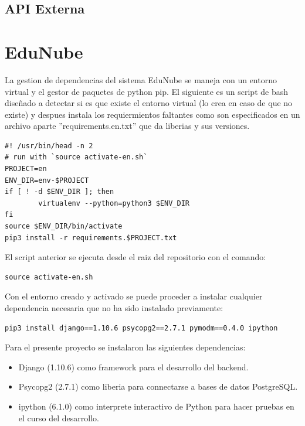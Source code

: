 
%
%

\subsection{API Externa}

\section{EduNube}

La gestion de dependencias del sistema EduNube se maneja con un entorno virtual y el gestor de paquetes de python pip. El siguiente es un script de bash diseñado a detectar si es que existe el entorno virtual (lo crea en caso de que no existe) y despues instala los requiermientos faltantes como son especificados en un archivo aparte ''requirements.en.txt'' que da liberias y sus versiones.

\begin{lstlisting}
#! /usr/bin/head -n 2
# run with `source activate-en.sh`
PROJECT=en
ENV_DIR=env-$PROJECT
if [ ! -d $ENV_DIR ]; then
        virtualenv --python=python3 $ENV_DIR
fi
source $ENV_DIR/bin/activate
pip3 install -r requirements.$PROJECT.txt
\end{lstlisting}

El script anterior se ejecuta desde el raiz del repositorio con el comando:

\begin{lstlisting}
source activate-en.sh
\end{lstlisting}

Con el entorno creado y activado se puede proceder a instalar cualquier dependencia necesaria que no ha sido instalado previamente:

\begin{lstlisting}
pip3 install django==1.10.6 psycopg2==2.7.1 pymodm==0.4.0 ipython
\end{lstlisting}

Para el presente proyecto se instalaron las siguientes dependencias:
\begin{itemize}
	\item Django (1.10.6) como framework para el desarrollo del backend.
    \item Psycopg2 (2.7.1) como liberia para connectarse a bases de datos PostgreSQL.
    \item ipython (6.1.0) como interprete interactivo de Python para hacer pruebas en el curso del desarrollo.
\end{itemize}

